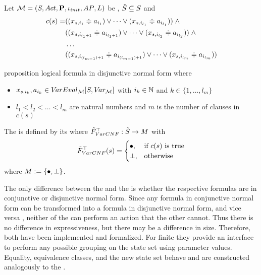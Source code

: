 \documentclass[preview]{standalone}
\begin{document}
\begin{definition}
	Let $\chgph = \chgphtuple$ be \achgphN, $\smstates \subseteq \states$ and 
	\begin{align*}
		c(s) = &((\varstate[,i_1] \eqorneq \varval_{i_1}) \lor \dots \lor (\varstate[,i_{l_1}] \eqorneq \varval_{i_{l_1}})) \; \land \\
		&((\varstate[,i_{l_1+1}] \eqorneq \varval_{i_{l_1+1}}) \lor \dots \lor (\varstate[,i_{l_2}] \eqorneq \varval_{i_{l_2}})) \; \land \\
		&\dots \\ 
		&((\varstate[,i_{(l_{m-1})+1}] \eqorneq \varval_{i_{(l_{m-1})+1}}) \lor \dots \lor (\varstate[,i_{l_m}] \eqorneq \varval_{i_{l_m}}))
	\end{align*}
	
	proposition logical formula in disjunctive normal form where
	\begin{itemize}
			\item $\varstate[,i_k], a_{i_k} \in \varevalimg$ with $i_k\in \natnums$ and $k \in \{1, \dots, l_m\}$
			\item $l_1 < l_2 < \dots < l_m$ are natural numbers and $m$ is the number of clauses in $c(s)$
	\end{itemize}
	The \viewN \viewparamcnf is defined by its \grpfctN \gfctparamcnf where $\gfctsubparamcnf : \smstates \to \imggrp$ with
	\[
	\gfctsubparamcnf(\state) =
	\begin{cases}
			\remelem, &\text{if } c(\state) \text{ is true}\\
			\notppty, 	&\text{otherwise}
		\end{cases}
	\]
	where $\imggrp := \imggrpbinview$.
\end{definition}

The only difference between the \viewN \viewparamcnf and the \viewN \viewparamdnf is whether the respective formulas are in conjunctive or disjunctive normal form. Since any formula in conjunctive normal form can be transformed into a formula in disjunctive normal form, and vice versa \cite[Theorem 4.12]{Baier2011}, neither of the \viewsN can perform an action that the other cannot. Thus there is no difference in expressiveness, but there may be a difference in size. Therefore, both \viewsN have been implemented and formalized. For finite \chgphsN they provide an interface to perform any possible grouping on the state set using parameter values. Equality, equivalence classes, and the new state set behave and are constructed analogously to the \viewN \viewparamdnf.
\end{document}
